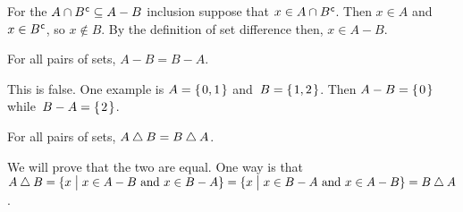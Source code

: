 \documentclass{test}  %
\begin{document}
\begin{problem}
\begin{exes}
\begin{answer}
  For the $A\cap{B}^{\mspace{1mu}\mathsf{c}}\subseteq A-B$ inclusion suppose that
  $x\in A\cap{B}^{\mspace{1mu}\mathsf{c}}$.
  Then $x\in A$ and $x\in{B}^{\mspace{1mu}\mathsf{c}}$, so $x\notin B$.
  By the definition of set difference then, $x\in A-B$.  
\end{answer}
\begin{exercise} 
  For all pairs of sets, $A-B=B-A$.
\end{exercise}
\begin{answer}
  This is false.
  One example is $A=\mbox{$\{\hspace{0.1em}0,1\hspace{0.1em}\}$}$ and~$B=\mbox{$\{\hspace{0.1em}1,2\hspace{0.1em}\}$}$.
  Then $A-B=\mbox{$\{\hspace{0.1em}0\hspace{0.1em}\}$}$ while~$B-A=\mbox{$\{\hspace{0.1em}2\hspace{0.1em}\}$}$.  
\end{answer}
\begin{exercise} 
  For all pairs of sets, $A\mathbin{\triangle} B=B\mathbin{\triangle} A$.
\end{exercise}
\begin{answer}
  We will prove that the two are equal.
  One way is that 
  $A\mathbin{\triangle} B=\{x \bigm| \text{$x\in A-B$ and $x\in B-A$}\}
              =\{x \bigm| \text{$x\in B-A$ and $x\in A-B$}\}
              =B\mathbin{\triangle} A$.  
\end{answer}
\end{exes}

  
\end{problem}
\end{document}
